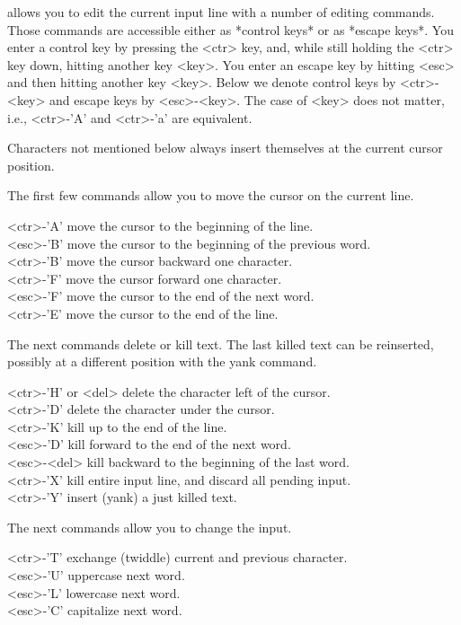 %

{\GAP} allows you to edit the current input line with a number of editing
commands.  Those commands  are accessible either as  *control keys* or as
*escape keys*.  You enter a control key  by  pressing the <ctr> key, and,
while still holding the <ctr> key  down, hitting another  key <key>.  You
enter an escape key by hitting <esc> and then hitting  another key <key>.
Below   we denote control  keys   by  <ctr>-<key>  and  escape  keys   by
<esc>-<key>.  The case  of <key>  does   not matter, i.e., <ctr>-'A'  and
<ctr>-'a' are equivalent.

Characters  not mentioned below always  insert  themselves at the current
cursor position.

The first few commands allow you to move the cursor on the current line.

<ctr>-'A'       move the cursor to the beginning of the line. \\
<esc>-'B'       move the cursor to the beginning of the previous word. \\
<ctr>-'B'       move the cursor backward one character. \\
<ctr>-'F'       move the cursor forward  one character. \\
<esc>-'F'       move the cursor to the end of the next word. \\
<ctr>-'E'       move the cursor to the end of the line.

The next commands delete or  kill  text.  The  last killed   text can  be
reinserted, possibly at a different position with the yank command.

<ctr>-'H' or <del> delete the character left of the cursor. \\
<ctr>-'D'       delete the character under the cursor. \\
<ctr>-'K'       kill up to the end of the line. \\
<esc>-'D'       kill forward to the end of the next word. \\
<esc>-<del>     kill backward to the beginning of the last word. \\
<ctr>-'X'       kill entire input line, and discard all pending input. \\
<ctr>-'Y'       insert (yank) a just killed text.

The next commands allow you to change the input.

<ctr>-'T'       exchange (twiddle) current and previous character. \\
<esc>-'U'       uppercase next word. \\
<esc>-'L'       lowercase next word. \\
<esc>-'C'       capitalize next word.


